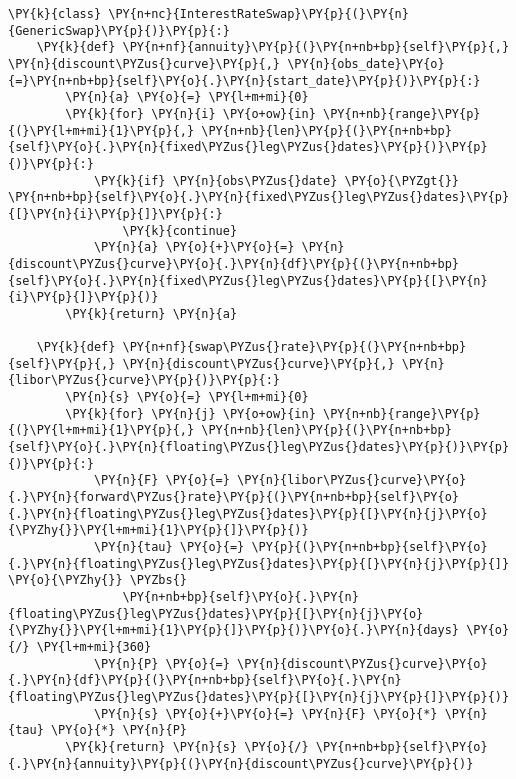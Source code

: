 \begin{codebox}[breakable, size=fbox, boxrule=1pt, pad at break*=1mm,colback=cellbackground, colframe=cellborder]
\begin{Verbatim}[commandchars=\\\{\}]
\PY{k}{class} \PY{n+nc}{InterestRateSwap}\PY{p}{(}\PY{n}{GenericSwap}\PY{p}{)}\PY{p}{:}        
    \PY{k}{def} \PY{n+nf}{annuity}\PY{p}{(}\PY{n+nb+bp}{self}\PY{p}{,} \PY{n}{discount\PYZus{}curve}\PY{p}{,} \PY{n}{obs_date}\PY{o}{=}\PY{n+nb+bp}{self}\PY{o}{.}\PY{n}{start_date}\PY{p}{)}\PY{p}{:}
        \PY{n}{a} \PY{o}{=} \PY{l+m+mi}{0}
        \PY{k}{for} \PY{n}{i} \PY{o+ow}{in} \PY{n+nb}{range}\PY{p}{(}\PY{l+m+mi}{1}\PY{p}{,} \PY{n+nb}{len}\PY{p}{(}\PY{n+nb+bp}{self}\PY{o}{.}\PY{n}{fixed\PYZus{}leg\PYZus{}dates}\PY{p}{)}\PY{p}{)}\PY{p}{:}
            \PY{k}{if} \PY{n}{obs\PYZus{}date} \PY{o}{\PYZgt{}} \PY{n+nb+bp}{self}\PY{o}{.}\PY{n}{fixed\PYZus{}leg\PYZus{}dates}\PY{p}{[}\PY{n}{i}\PY{p}{]}\PY{p}{:}
                \PY{k}{continue}
            \PY{n}{a} \PY{o}{+}\PY{o}{=} \PY{n}{discount\PYZus{}curve}\PY{o}{.}\PY{n}{df}\PY{p}{(}\PY{n+nb+bp}{self}\PY{o}{.}\PY{n}{fixed\PYZus{}leg\PYZus{}dates}\PY{p}{[}\PY{n}{i}\PY{p}{]}\PY{p}{)}
        \PY{k}{return} \PY{n}{a}
	
    \PY{k}{def} \PY{n+nf}{swap\PYZus{}rate}\PY{p}{(}\PY{n+nb+bp}{self}\PY{p}{,} \PY{n}{discount\PYZus{}curve}\PY{p}{,} \PY{n}{libor\PYZus{}curve}\PY{p}{)}\PY{p}{:}
        \PY{n}{s} \PY{o}{=} \PY{l+m+mi}{0}
        \PY{k}{for} \PY{n}{j} \PY{o+ow}{in} \PY{n+nb}{range}\PY{p}{(}\PY{l+m+mi}{1}\PY{p}{,} \PY{n+nb}{len}\PY{p}{(}\PY{n+nb+bp}{self}\PY{o}{.}\PY{n}{floating\PYZus{}leg\PYZus{}dates}\PY{p}{)}\PY{p}{)}\PY{p}{:}
            \PY{n}{F} \PY{o}{=} \PY{n}{libor\PYZus{}curve}\PY{o}{.}\PY{n}{forward\PYZus{}rate}\PY{p}{(}\PY{n+nb+bp}{self}\PY{o}{.}\PY{n}{floating\PYZus{}leg\PYZus{}dates}\PY{p}{[}\PY{n}{j}\PY{o}{\PYZhy{}}\PY{l+m+mi}{1}\PY{p}{]}\PY{p}{)}
            \PY{n}{tau} \PY{o}{=} \PY{p}{(}\PY{n+nb+bp}{self}\PY{o}{.}\PY{n}{floating\PYZus{}leg\PYZus{}dates}\PY{p}{[}\PY{n}{j}\PY{p}{]} \PY{o}{\PYZhy{}} \PYZbs{}
                \PY{n+nb+bp}{self}\PY{o}{.}\PY{n}{floating\PYZus{}leg\PYZus{}dates}\PY{p}{[}\PY{n}{j}\PY{o}{\PYZhy{}}\PY{l+m+mi}{1}\PY{p}{]}\PY{p}{)}\PY{o}{.}\PY{n}{days} \PY{o}{/} \PY{l+m+mi}{360}
            \PY{n}{P} \PY{o}{=} \PY{n}{discount\PYZus{}curve}\PY{o}{.}\PY{n}{df}\PY{p}{(}\PY{n+nb+bp}{self}\PY{o}{.}\PY{n}{floating\PYZus{}leg\PYZus{}dates}\PY{p}{[}\PY{n}{j}\PY{p}{]}\PY{p}{)}
            \PY{n}{s} \PY{o}{+}\PY{o}{=} \PY{n}{F} \PY{o}{*} \PY{n}{tau} \PY{o}{*} \PY{n}{P}
        \PY{k}{return} \PY{n}{s} \PY{o}{/} \PY{n+nb+bp}{self}\PY{o}{.}\PY{n}{annuity}\PY{p}{(}\PY{n}{discount\PYZus{}curve}\PY{p}{)}
	

\end{Verbatim}
\end{codebox}
